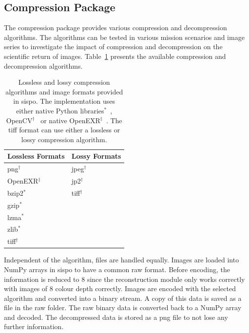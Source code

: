 \subsection{Compression Package}
The compression package provides various compression and decompression algorithms. The algorithms can be tested in various mission scenarios and image series to investigate the impact of compression and decompression on the scientific return of images. Table~\ref{tab:compression_format} presents the available compression and decompression algorithms.

\begin{table}[htb]
    \centering
    \caption{Lossless and lossy compression algorithms and image formats provided in \gls{sispo}. The implementation uses either native Python libraries$^{\ast}$~\cite{FoundationDataArchiving}, OpenCV$^{\dagger}$~\cite{opencv_library} or native OpenEXR$^{\ddagger}$~\cite{openexr}. The \gls{tiff} format can use either a lossless or lossy compression algorithm.}
    \label{tab:compression_format}
    \begin{tabular}{l|l}
        \textbf{Lossless Formats}  & \textbf{Lossy Formats} \\ \hline
        \gls{png}$^{\dagger}$      & \gls{jpeg}$^{\dagger}$  \\
        OpenEXR$^{\ddagger}$       & \gls{jp2}$^{\dagger}$   \\
        bzip2$^{\ast}$             & \gls{tiff}$^{\dagger}$  \\
        gzip$^{\ast}$              &                \\
        \gls{lzma}$^{\ast}$        &                \\
        zlib$^{\ast}$              &     \\
        \gls{tiff}$^{\dagger}$     &  
    \end{tabular}
\end{table}

Independent of the algorithm, files are handled equally. Images are loaded into NumPy arrays in \gls{sispo} to have a common raw format. Before encoding, the information is reduced to \SI{8}{\bit} since the reconstruction module only works correctly with images of \SI{8}{\bit} colour depth correctly. Images are encoded with the selected algorithm and converted into a binary stream. A copy of this data is saved as a file in the raw folder. The raw binary data is converted back to a NumPy array and decoded. The decompressed data is stored as a \gls{png} file to not lose any further information.

